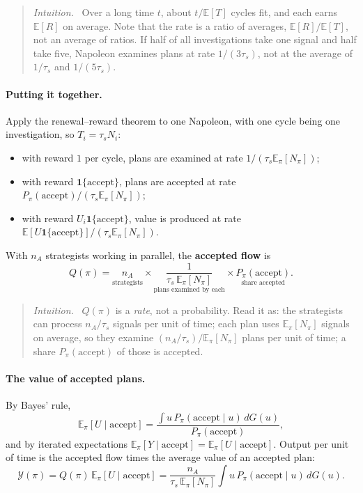\documentclass[11pt]{article}
\newcommand{\Nap}{\textcolor{nap}{Napoleon}}
\theoremstyle{remark}
\newenvironment{intuition}{\begin{quote}\small\color{muted}\textit{Intuition.}\ }{\end{quote}}
\newcommand{\E}{\mathbb{E}}
\newcommand{\Ycal}{\mathcal{Y}}
\newcommand{\accept}{\text{accept}}
\begin{document}
\begin{intuition}
Over a long time $t$, about $t/\E[T]$ cycles fit, and each earns $\E[R]$ on average. Note that the rate is a ratio of averages, $\E[R]/\E[T]$, not an average of ratios. If half of all investigations take one signal and half take five, \Nap{} examines plans at rate $1/(3\tau_s)$, not at the average of $1/\tau_s$ and $1/(5\tau_s)$.
\end{intuition}

\paragraph{Putting it together.} Apply the renewal--reward theorem to one \Nap, with one cycle being one investigation, so $T_i=\tau_sN_i$:
\begin{itemize}
  \item with reward $1$ per cycle, plans are examined at rate $1/(\tau_s\E_\pi[N_\pi])$;
  \item with reward $\mathbf 1\{\accept\}$, plans are accepted at rate $P_\pi(\accept)/(\tau_s\E_\pi[N_\pi])$;
  \item with reward $U_i\mathbf 1\{\accept\}$, value is produced at rate $\E[U\mathbf 1\{\accept\}]/(\tau_s\E_\pi[N_\pi])$.
\end{itemize}
With $n_A$ strategists working in parallel, the \textbf{accepted flow} is
\begin{equation}\label{eq:Q}
Q(\pi)=\underset{\text{strategists}}{n_A}\times\underset{\text{plans examined by each}}{\frac{1}{\tau_s\,\E_\pi[N_\pi]}}\times\underset{\text{share accepted}}{P_\pi(\accept)}.
\end{equation}

\begin{intuition}
$Q(\pi)$ is a \emph{rate}, not a probability. Read it as: the strategists can process $n_A/\tau_s$ signals per unit of time; each plan uses $\E_\pi[N_\pi]$ signals on average, so they examine $(n_A/\tau_s)/\E_\pi[N_\pi]$ plans per unit of time; a share $P_\pi(\accept)$ of those is accepted.
\end{intuition}

\paragraph{The value of accepted plans.} By Bayes' rule,
\begin{equation}\label{eq:Uaccept}
\E_\pi[U\mid\accept]=\frac{\int u\,P_\pi(\accept\mid u)\,dG(u)}{P_\pi(\accept)},
\end{equation}
and by iterated expectations $\E_\pi[Y\mid\accept]=\E_\pi[U\mid\accept]$. Output per unit of time is the accepted flow times the average value of an accepted plan:
\begin{equation}\label{eq:output}
\Ycal(\pi)=Q(\pi)\,\E_\pi[U\mid\accept]=\frac{n_A}{\tau_s\,\E_\pi[N_\pi]}\int u\,P_\pi(\accept\mid u)\,dG(u).
\end{equation}
\end{document}
